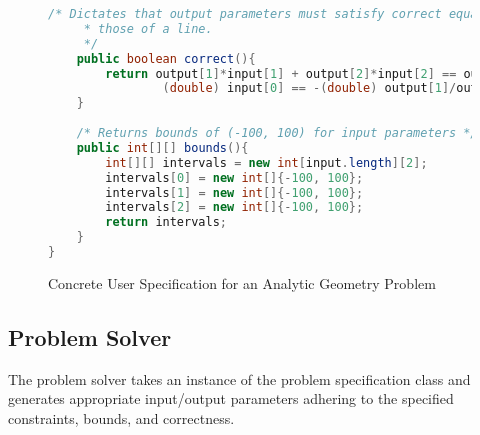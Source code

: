 \begin{singlespace}
\begin{figure}
\begin{lstlisting}[language=Java]
	/* Dictates that output parameters must satisfy correct equations for
	 * those of a line. 
	 */
	public boolean correct(){
		return output[1]*input[1] + output[2]*input[2] == output[0] &&
				(double) input[0] == -(double) output[1]/output[2];
	}
	
	/* Returns bounds of (-100, 100) for input parameters */
	public int[][] bounds(){
		int[][] intervals = new int[input.length][2];
		intervals[0] = new int[]{-100, 100};
		intervals[1] = new int[]{-100, 100};
		intervals[2] = new int[]{-100, 100};
		return intervals;
	}
}
\end{lstlisting}
\caption{Concrete User Specification for an Analytic Geometry Problem}
\label{fig:problem}
\end{figure}

\end{singlespace}

\subsection{Problem Solver}

The problem solver takes an instance of the problem specification class and generates appropriate input/output parameters adhering to the specified constraints, bounds, and correctness. 

